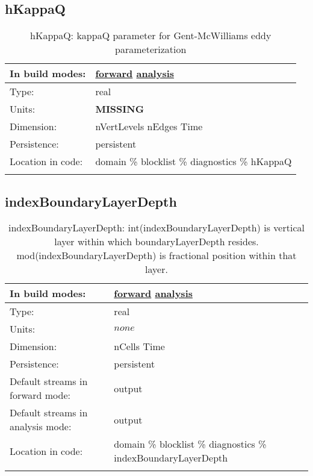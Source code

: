 \subsection[hKappaQ]{hKappaQ}
\label{subsec:var_sec_diagnostics_hKappaQ}
\begin{center}
\begin{longtable}{| p{2.0in} | p{4.0in} |}
        \hline 
        In build modes: & \hyperref[subsec:forward_var_tab_diagnostics]{forward} \hyperref[subsec:analysis_var_tab_diagnostics]{analysis} \\
        \hline 
        Type: & real \\
        \hline 
        Units: & {\bf \color{red} MISSING} \\
        \hline 
        Dimension: & nVertLevels nEdges Time \\
        \hline 
        Persistence: & persistent \\
        \hline 
		 Location in code: & domain \% blocklist \% diagnostics \% hKappaQ \\
		 \hline 
    \caption{hKappaQ: kappaQ parameter for Gent-McWilliams eddy parameterization}
\end{longtable}
\end{center}
\subsection[indexBoundaryLayerDepth]{indexBoundaryLayerDepth}
\label{subsec:var_sec_diagnostics_indexBoundaryLayerDepth}
\begin{center}
\begin{longtable}{| p{2.0in} | p{4.0in} |}
        \hline 
        In build modes: & \hyperref[subsec:forward_var_tab_diagnostics]{forward} \hyperref[subsec:analysis_var_tab_diagnostics]{analysis} \\
        \hline 
        Type: & real \\
        \hline 
        Units: & $none$ \\
        \hline 
        Dimension: & nCells Time \\
        \hline 
        Persistence: & persistent \\
        \hline 
		 Default streams in forward mode: &  output \\
        \hline 
		 Default streams in analysis mode: &  output \\
        \hline 
		 Location in code: & domain \% blocklist \% diagnostics \% indexBoundaryLayerDepth \\
		 \hline 
    \caption{indexBoundaryLayerDepth: int(indexBoundaryLayerDepth) is vertical layer within which boundaryLayerDepth resides. mod(indexBoundaryLayerDepth) is fractional position within that layer.}
\end{longtable}
\end{center}
